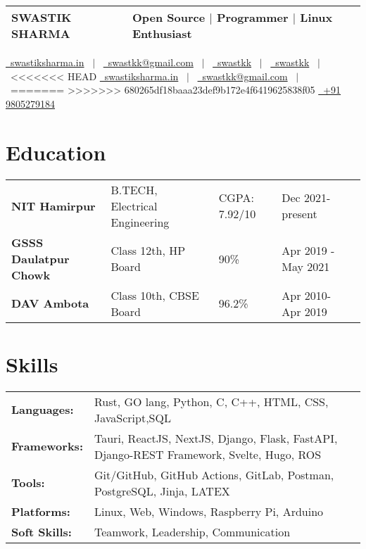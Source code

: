 \documentclass[legalpaper,11pt]{article}
\begin{document}
\pagestyle{empty} 


\begin{tabularx}{\linewidth}{@{} l X @{}}
\Huge{SWASTIK SHARMA} & \small{Open Source $|$ Programmer $|$ Linux Enthusiast} \\[6pt]
\hline %
\end{tabularx}

\begin{flushleft}
\href{https://www.swastiksharma.in}{\raisebox{-0.05\height}\faGlobe \ swastiksharma.in} \ $|$ \
\href{mailto:swastkk@gmail.com}{\raisebox{-0.05\height}\faEnvelope \ swastkk@gmail.com} \ $|$ \ 
\href{https://github.com/swastkk}{\raisebox{-0.05\height}\faGithub\ swastkk} \ $|$ \ 
\href{https://linkedin.com/in/swastkk}{\raisebox{-0.05\height}\faLinkedin\ swastkk} \ $|$ \ 
<<<<<<< HEAD
\href{https://swastiksharma.in}{\raisebox{-0.05\height}\faGlobe \ swastiksharma.in} \ $|$ \ 
\href{mailto:swastkk@gmail.com}{\raisebox{-0.05\height}\faEnvelope \ swastkk@gmail.com} \ $|$ \ 
=======
>>>>>>> 680265df18baaa23def9b172e4f6419625838f05
\href{tel:+91 9805279184}{\raisebox{-0.05\height}\faMobile \ +91 9805279184} \\
\end{flushleft}


\section{Education}

\begin{tabular}{lllll}
\textbf{NIT Hamirpur}         & B.TECH, Electrical Engineering & CGPA: 7.92/10 & Dec 2021- present   &  \\
\textbf{GSSS Daulatpur Chowk} & Class 12th, HP Board           & 90\%          & Apr 2019 - May 2021 &  \\
\textbf{DAV Ambota}           & Class 10th, CBSE Board         & 96.2\%        & Apr 2010- Apr 2019  &  \\
                                  
\end{tabular}

\section{Skills}
\begin{tabularx}{\linewidth}{@{}l X@{}}
\textbf{Languages:} &  \normalsize{Rust, GO lang, Python, C, C++, HTML, CSS, JavaScript,SQL}\\
\textbf{Frameworks:}  &  \normalsize{Tauri, ReactJS, NextJS, Django, Flask, FastAPI, Django-REST Framework, Svelte, Hugo, ROS}\\  
\textbf{Tools:} &  \normalsize{Git/GitHub, GitHub Actions, GitLab, Postman, PostgreSQL, Jinja, LATEX} \\
\textbf{Platforms:} &  \normalsize{Linux, Web, Windows, Raspberry Pi, Arduino}\\
\textbf{Soft Skills:} &  \normalsize{Teamwork, Leadership, Communication}\\
\end{tabularx}
\end{document}
